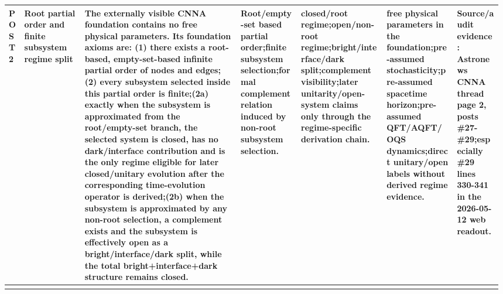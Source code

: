\begin{longtable}{L{0.035\linewidth} L{0.12\linewidth} L{0.31\linewidth} L{0.12\linewidth} L{0.17\linewidth} L{0.14\linewidth} L{0.09\linewidth}}
\hline
\addlinespace[0.24em]
POST2 & Root partial order and finite subsystem regime split & The externally visible CNNA foundation contains no free physical parameters. Its foundation axioms are: (1) there exists a root-based, empty-set-based infinite partial order of nodes and edges;\newline (2) every subsystem selected inside this partial order is finite;\newline (2a) exactly when the subsystem is approximated from the root/\allowbreak{}empty-set branch, the selected system is closed, has no dark/\allowbreak{}interface contribution and is the only regime eligible for later closed/\allowbreak{}unitary evolution after the corresponding time-evolution operator is derived;\newline (2b) when the subsystem is approximated by any non-root selection, a complement exists and the subsystem is effectively open as a bright/\allowbreak{}interface/\allowbreak{}dark split, while the total bright+interface+dark structure remains closed. & Root/\allowbreak{}empty-set based partial order;\newline finite subsystem selection;\newline formal complement relation induced by non-root subsystem selection. & closed/\allowbreak{}root regime;\newline open/\allowbreak{}non-root regime;\newline bright/\allowbreak{}interface/\allowbreak{}dark split;\newline complement visibility;\newline later unitarity/\allowbreak{}open-system claims only through the regime-specific derivation chain. & free physical parameters in the foundation;\newline pre-assumed stochasticity;\newline pre-assumed spacetime horizon;\newline pre-assumed QFT/\allowbreak{}AQFT/\allowbreak{}OQS dynamics;\newline direct unitary/\allowbreak{}open labels without derived regime evidence. & Source/\allowbreak{}audit evidence: Astronews CNNA thread page 2, posts \#27-\#29;\newline especially \#29 lines 330-341 in the 2026-05-12 web readout.\\
\hline
\addlinespace[0.24em]

\end{longtable}
